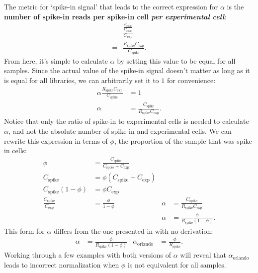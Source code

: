 The metric for `spike-in signal' that leads to the correct expression for $\alpha$ is the \textbf{number of spike-in reads per spike-in cell \textit{per experimental cell}}:
\begin{align*}
    & \frac{ \frac{R_\text{spike}}{C_\text{spike}}}{C_\text{exp}} \\
    = & \frac{R_\text{spike} C_\text{exp}}{C_\text{spike}}.
\end{align*}
From here, it's simple to calculate $\alpha$ by setting this value to be equal for all samples.
Since the actual value of the spike-in signal doesn't matter as long as it is equal for all libraries, we can arbitrarily set it to $1$ for convenience:
\begin{align*}
    \alpha \frac{R_\text{spike} C_\text{exp}}{C_\text{spike}} &= 1 \\
    \alpha &= \frac{C_\text{spike}}{R_\text{spike} C_\text{exp}}.
\end{align*}
Notice that only the ratio of spike-in to experimental cells is needed to calculate $\alpha$, and not the absolute number of spike-in and experimental cells.
We can rewrite this expression in terms of $\phi$, the proportion of the sample that was spike-in cells:
\begin{align*}
    \phi &= \frac{C_\text{spike}}{C_\text{spike} + C_\text{exp}} \\
    C_\text{spike} & = \phi \left(C_\text{spike} + C_\text{exp} \right) \\
    C_\text{spike} \left(1-\phi \right) & = \phi C_\text{exp} \\
    \frac{C_\text{spike}}{C_\text{exp}} & = \frac{\phi}{1-\phi} & \alpha &= \frac{C_\text{spike}}{R_\text{spike} C_\text{exp}} \\
                                        && \alpha &= \frac{\phi}{R_\text{spike} \left(1-\phi \right)}.
\end{align*}
This form for $\alpha$ differs from the one presented in \citet{orlando2014} with no derivation:
\begin{align*}
    \alpha &= \frac{\phi}{R_\text{spike} \left(1-\phi \right)} & \alpha_\text{orlando} &= \frac{\phi}{R_\text{spike}}.
\end{align*}
Working through a few examples with both versions of $\alpha$ will reveal that $\alpha_\text{orlando}$ leads to incorrect normalization when $\phi$ is not equivalent for all samples.

